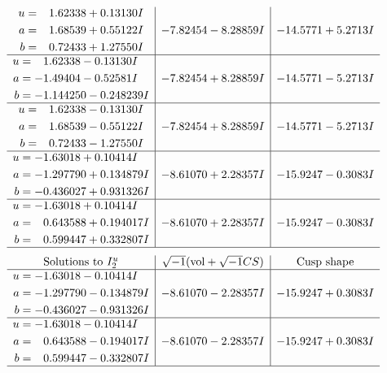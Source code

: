 \documentclass[1p]{elsarticle_modified}
\theoremstyle{definition}
\newcommand{\I}{\sqrt{-1}}
\begin{document}
$$\begin{array}{c|c|c}
\begin{aligned}
u &= \phantom{-}1.62338 + 0.13130 I \\
a &= \phantom{-}1.68539 + 0.55122 I \\
b &= \phantom{-}0.72433 + 1.27550 I\end{aligned}
 & -7.82454 - 8.28859 I & -14.5771 + 5.2713 I \\ \hline\begin{aligned}
u &= \phantom{-}1.62338 - 0.13130 I \\
a &= -1.49404 - 0.52581 I \\
b &= -1.144250 - 0.248239 I\end{aligned}
 & -7.82454 + 8.28859 I & -14.5771 - 5.2713 I \\ \hline\begin{aligned}
u &= \phantom{-}1.62338 - 0.13130 I \\
a &= \phantom{-}1.68539 - 0.55122 I \\
b &= \phantom{-}0.72433 - 1.27550 I\end{aligned}
 & -7.82454 + 8.28859 I & -14.5771 - 5.2713 I \\ \hline\begin{aligned}
u &= -1.63018 + 0.10414 I \\
a &= -1.297790 + 0.134879 I \\
b &= -0.436027 + 0.931326 I\end{aligned}
 & -8.61070 + 2.28357 I & -15.9247 - 0.3083 I \\ \hline\begin{aligned}
u &= -1.63018 + 0.10414 I \\
a &= \phantom{-}0.643588 + 0.194017 I \\
b &= \phantom{-}0.599447 + 0.332807 I\end{aligned}
 & -8.61070 + 2.28357 I & -15.9247 - 0.3083 I\\
 \hline 
 \end{array}$$\newpage$$\begin{array}{c|c|c}  
\text{Solutions to }I^u_{2}& \I (\text{vol} + \sqrt{-1}CS) & \text{Cusp shape}\\
 \hline 
\begin{aligned}
u &= -1.63018 - 0.10414 I \\
a &= -1.297790 - 0.134879 I \\
b &= -0.436027 - 0.931326 I\end{aligned}
 & -8.61070 - 2.28357 I & -15.9247 + 0.3083 I \\ \hline\begin{aligned}
u &= -1.63018 - 0.10414 I \\
a &= \phantom{-}0.643588 - 0.194017 I \\
b &= \phantom{-}0.599447 - 0.332807 I\end{aligned}
 & -8.61070 - 2.28357 I & -15.9247 + 0.3083 I\\
 \hline 
 \end{array}$$\newpage\newpage\renewcommand{\arraystretch}{1}
\end{document}
